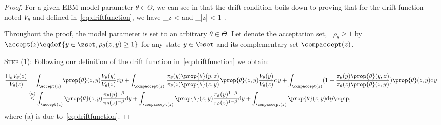 \documentclass[letterpaper]{article} %
\begin{document}
\begin{proof}
For a given EBM model parameter $\theta \in \Theta$, we can see in \cite{jarner2000geometric} that the drift condition boils down to proving that for the drift function noted $V_\theta$ and defined in~\eqref{eq:driftfunction}, we have
\beq\label{mainproof}
\sup \limits_{z \in \zset}   < \infty \quad \textrm{and} \quad \lim \sup \limits_{|z| \to \infty}   < 1 \eqsp.
\eeq

Throughout the proof, the model parameter is set to an arbitrary $\theta \in \Theta$.
Let denote the acceptation set, \ie\ $\rho_\theta \geq 1$ by $\accept(z) \eqdef \{ y \in \zset, \rho_\theta(z,y) \geq 1 \}$ for any state $y \in \bset$ and its complementary set $\compaccept(z)$.

\medskip
\noindent \textsc{Step (1): } Following our definition of the drift function in~\eqref{eq:driftfunction} we obtain:

\begin{align}\label{eq:main1}
 \frac{\Pi_\theta V_\theta(z)}{V_\theta(z)} & = \int_{\accept(z)}  \prop{\theta}(z,y) \frac{V_\theta(y)}{V_\theta(z)} \textrm{d}y +  \int_{\compaccept(z)} \frac{\pi_\theta(y)\prop{\theta}(y,z)}{\pi_\theta(z)\prop{\theta}(z,y)} \prop{\theta}(z,y) \frac{V_\theta(y)}{V_\theta(z)} \textrm{d}y +  \int_{\compaccept(z)} (1 - \frac{\pi_\theta(y)\prop{\theta}(y,z)}{\pi_\theta(z)\prop{\theta}(z,y)}) \prop{\theta}(z,y)  \textrm{d}y\\
 &  \overset{(a)}{\leq} \int_{\accept(z)}  \prop{\theta}(z,y) \frac{\pi_\theta(y)^{-\beta}}{\pi_\theta(z)^{-\beta}} \textrm{d}y  + \int_{\compaccept(z)} \prop{\theta}(z,y) \frac{\pi_\theta(y)^{1-\beta}}{\pi_\theta(z)^{1-\beta}}\textrm{d}y +  \int_{\compaccept(z)} \prop{\theta}(z,y)  \textrm{d}y \eqsp,
\end{align}
where (a) is due to~\eqref{eq:driftfunction}.


\end{proof}
\end{document}
